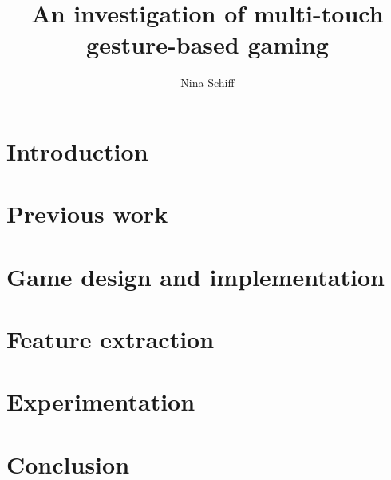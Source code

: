 \documentclass[oneside]{report}
\title{An investigation of multi-touch gesture-based gaming}
\author{Nina Schiff}
\begin{document}
	

	\begin{abstract}
		
	\end{abstract}



	\tableofcontents
	\listoffigures
	\listoftables

	\glsaddall
	\printglossaries


	\chapter{Introduction}
		

	\chapter{Previous work}
		
		
		
		

	\chapter{Game design and implementation}
		
		
		

	\chapter{Feature extraction}
		
		
		
			

	\chapter{Experimentation}
		
		
		
	
	\chapter{Conclusion}
		
	
	
	
	\nocite{*}
	

	\appendix
		
		
		
		
\end{document}
